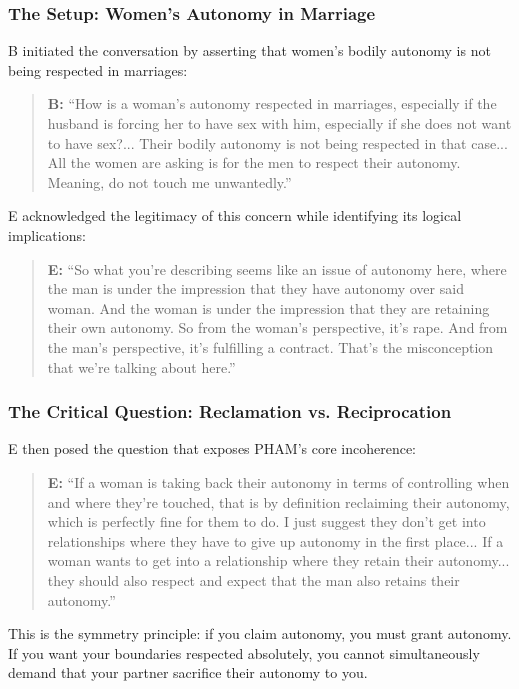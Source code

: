 \documentclass[12pt, letterpaper]{article}
\begin{document}
\subsubsection{The Setup: Women's Autonomy in Marriage}

B initiated the conversation by asserting that women's bodily autonomy is not being respected in marriages:

\begin{quote}
\textbf{B:} ``How is a woman's autonomy respected in marriages, especially if the husband is forcing her to have sex with him, especially if she does not want to have sex?... Their bodily autonomy is not being respected in that case... All the women are asking is for the men to respect their autonomy. Meaning, do not touch me unwantedly.''
\end{quote}

E acknowledged the legitimacy of this concern while identifying its logical implications:

\begin{quote}
\textbf{E:} ``So what you're describing seems like an issue of autonomy here, where the man is under the impression that they have autonomy over said woman. And the woman is under the impression that they are retaining their own autonomy. So from the woman's perspective, it's rape. And from the man's perspective, it's fulfilling a contract. That's the misconception that we're talking about here.''
\end{quote}

\subsubsection{The Critical Question: Reclamation vs. Reciprocation}

E then posed the question that exposes PHAM's core incoherence:

\begin{quote}
\textbf{E:} ``If a woman is taking back their autonomy in terms of controlling when and where they're touched, that is by definition reclaiming their autonomy, which is perfectly fine for them to do. I just suggest they don't get into relationships where they have to give up autonomy in the first place... If a woman wants to get into a relationship where they retain their autonomy... they should also respect and expect that the man also retains their autonomy.''
\end{quote}

This is the symmetry principle: if you claim autonomy, you must grant autonomy. If you want your boundaries respected absolutely, you cannot simultaneously demand that your partner sacrifice their autonomy to you.
\end{document}
